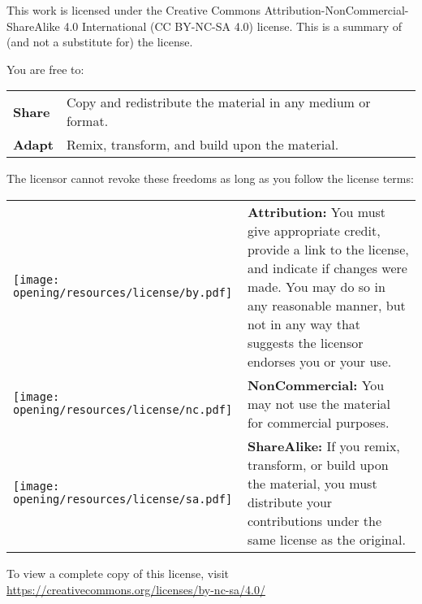     \noindent This work is licensed under the Creative Commons Attribution-NonCommercial-ShareAlike 4.0 International (CC BY-NC-SA 4.0) license. This is a summary of (and not a substitute for) the license. 
    
    \vspace{1mm}
    
    \noindent   You are free to:

    \vspace{1mm}
    
    \noindent
    \begin{tabular}{m{1.5cm} m{13.5cm}}
        \textbf{Share} & Copy and redistribute the material in any medium or format.\\
        \textbf{Adapt} & Remix, transform, and build upon the material.\\
    \end{tabular}
    
    \vspace{1mm}
    
    \noindent The licensor cannot revoke these freedoms as long as you follow the license terms:
    
    \noindent
    \begin{tabular}{m{1.5cm} m{13.5cm}}
        \texttt{[image: opening/resources/license/by.pdf]} & \textbf{Attribution:} You must give appropriate credit, provide a link to the license, and indicate if changes were made. You may do so in any reasonable manner, but not in any way that suggests the licensor endorses you or your use.\\
        \texttt{[image: opening/resources/license/nc.pdf]} & \textbf{NonCommercial:} You may not use the material for commercial purposes.\\
        \texttt{[image: opening/resources/license/sa.pdf]} & \textbf{ShareAlike:} If you remix, transform, or build upon the material, you must distribute your contributions under the same license as the original.
    \end{tabular}
    
    \noindent To view a complete copy of this license, visit 
    \href{https://creativecommons.org/licenses/by-nc-sa/4.0/}{https://creativecommons.org/licenses/by-nc-sa/4.0/}

\endgroup

\vspace*{5mm}

